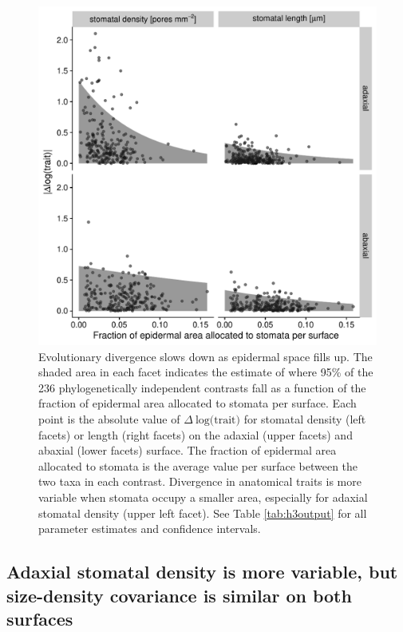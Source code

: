 \documentclass[
  12pt,
]{article}
\begin{document}
\begin{figure}[ht]
\includegraphics[width=\textwidth]{../figures/h3.pdf}
\caption{Evolutionary divergence slows down as epidermal space fills up. The shaded area in each facet indicates the estimate of where 95\% of the 236 phylogenetically independent contrasts fall as a function of the fraction of epidermal area allocated to stomata per surface. Each point is the absolute value of  $\Delta~\textrm{log(trait)}$ for stomatal density (left facets) or length (right facets) on the adaxial (upper facets) and abaxial (lower facets) surface. The fraction of epidermal area allocated to stomata is the average value per surface between the two taxa in each contrast. Divergence in anatomical traits is more variable when stomata occupy a smaller area, especially for adaxial stomatal density (upper left facet). See Table \ref{tab:h3output} for all parameter estimates and confidence intervals.}
\label{fig:h3}
\end{figure}

\hypertarget{adaxial-stomatal-density-is-more-variable-but-size-density-covariance-is-similar-on-both-surfaces}{%
\subsection{Adaxial stomatal density is more variable, but size-density covariance is similar on both surfaces}\label{adaxial-stomatal-density-is-more-variable-but-size-density-covariance-is-similar-on-both-surfaces}}
\end{document}
